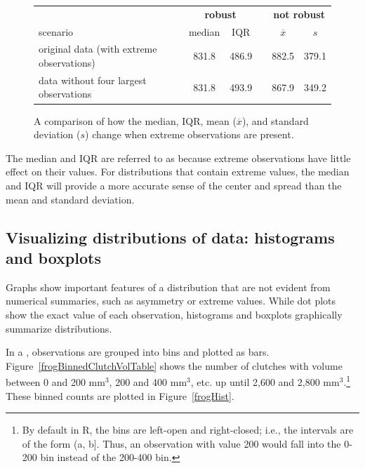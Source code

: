 \begin{figure}[ht]
	\centering
	\begin{tabular}{l c cc c cc}
		\hline
		& \hspace{0mm} & \multicolumn{2}{c}{\bf robust} & \hspace{2mm} & \multicolumn{2}{c}{\bf not robust} \\
		scenario && median & IQR && $\overline{x}$ & $s$ \\ 
		\hline
		original data (with extreme observations) 	&& 831.8 & 486.9 && 882.5 & 379.1 \\
		data without four largest observations && 831.8 & 493.9 && 867.9 & 349.2 \\
		\hline
	\end{tabular}
	\caption{A comparison of how the median, IQR, mean ($\overline{x}$), and standard deviation ($s$) change when extreme observations are present.}
	\label{frogRobustOrNotTable}
\end{figure}

The median and IQR are referred to as  because extreme observations have little effect on their values. For distributions that contain extreme values, the median and IQR will provide a more accurate sense of the center and spread than the mean and standard deviation. 




\subsection{Visualizing distributions of data: histograms and boxplots}
\label{histogramsBoxplots}

Graphs show important features of a distribution that are not evident from numerical summaries, such as asymmetry or extreme values. While dot plots show the exact value of each observation, histograms and boxplots graphically summarize distributions.

In a , observations are grouped into bins and plotted as bars. Figure~\ref{frogBinnedClutchVolTable} shows the number of clutches with volume between 0 and 200 $\textrm{mm}^{3}$, 200 and 400 $\textrm{mm}^{3}$, etc. up until 2,600 and 2,800 $\textrm{mm}^{3}$.\footnote{By default in \textsf{R}, the bins are left-open and right-closed; i.e., the intervals are of the form (a, b]. Thus, an observation with value 200 would fall into the 0-200 bin instead of the 200-400 bin.} These binned counts are plotted in Figure~\ref{frogHist}.


